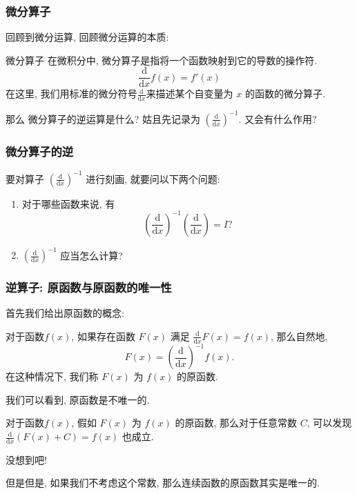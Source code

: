 \documentclass[
10pt,
aspectratio=43,
]{beamer}
\begin{document}
\begin{frame}
	\frametitle{微分算子}
	回顾到微分运算, 回顾微分运算的本质:
	\begin{block}{微分算子}
		在微积分中, 微分算子是指将一个函数映射到它的导数的操作符.
		$$
			\frac{\mathrm{d}}{\mathrm{d}x}f(x)=f'(x)
		$$
		在这里, 我们用标准的微分符号$\frac{\mathrm{d}}{\mathrm{d}x}$来描述某个自变量为 $x$ 的函数的微分算子.
	\end{block}
	\pause
	\vspace{0.2cm}
	\vfill
	\centering
	{
		\centering
		那么
	}
	\pause
	\vfill
	\centering
	{
		\centering
		微分算子的逆运算是什么? \pause 姑且先记录为 $\displaystyle\left(\frac{\mathrm{d}}{\mathrm{d}x}\right)^{-1}$. \pause 又会有什么作用?
	}
\end{frame}

\begin{frame}
	\frametitle{微分算子的逆}
	\begin{block}{}
		要对算子 $\left(\frac{\mathrm{d}}{\mathrm{d}x}\right)^{-1}$ 进行刻画, \pause 就要问以下两个问题:
		\vspace{0.3cm}
		\begin{enumerate}
			\pause
			\item 对于哪些函数来说, 有
			      $$
				      \displaystyle\left(\frac{\mathrm{d}}{\mathrm{d}x}\right)^{-1}\left(\frac{\mathrm{d}}{\mathrm{d}x}\right)=I?
			      $$
			      \vspace{0.2cm}
			      \pause
			\item $\displaystyle\left(\frac{\mathrm{d}}{\mathrm{d}x}\right)^{-1}$ 应当怎么计算?
		\end{enumerate}
		\vspace{0.3cm}
	\end{block}
\end{frame}

\begin{frame}
	\frametitle{逆算子: 原函数与原函数的唯一性}
	首先我们给出原函数的概念:
	\begin{block}{}
		对于函数$f(x)$, 如果存在函数 $F(x)$ 满足 $\frac{\mathrm{d}}{\mathrm{d}x} F(x) = f(x)$, 那么自然地,
		$$
			F(x)=\displaystyle\left(\frac{\mathrm{d}}{\mathrm{d}x}\right)^{-1}f(x).
		$$
		在这种情况下, 我们称 $F(x)$ 为 $f(x)$ 的原函数.
	\end{block}
	\pause
	我们可以看到, 原函数是不唯一的.
	\pause
	\begin{block}{}
		对于函数$f(x)$, 假如 $F(x)$ 为 $f(x)$ 的原函数, 那么对于任意常数 $C$, 可以发现 $\frac{\mathrm{d}}{\mathrm{d}x} \left(F(x)+C\right) = f(x)$ 也成立.
	\end{block}
	\pause
	\begin{block}{}
		\vfill
		\centering
		{
			\centering
			没想到吧!
		}
	\end{block}
	但是但是, 如果我们不考虑这个常数, 那么连续函数的原函数其实是唯一的.
\end{frame}
\end{document}
